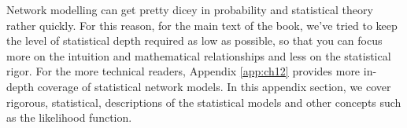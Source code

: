 Network modelling can get pretty dicey in probability and statistical theory rather quickly. For this reason, for the main text of the book, we've tried to keep the level of statistical depth required as low as possible, so that you can focus more on the intuition and mathematical relationships and less on the statistical rigor. For the more technical readers, Appendix \ref{app:ch12} provides more in-depth coverage of statistical network models. In this appendix section, we cover rigorous, statistical, descriptions of the statistical models and other concepts such as the likelihood function.

\newpage













